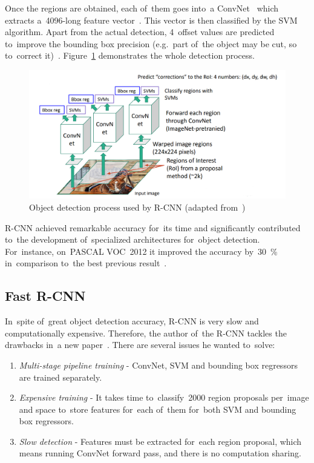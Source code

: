 Once the regions are obtained, each of~them goes into~a ConvNet~\cite{r-cnn-cnn} which extracts \hbox{a 4096-long} feature vector~\cite{r-cnn}. This vector is then classified by the SVM~\cite{svm} algorithm. Apart from the actual detection, 4~offset values are predicted to~improve the bounding box precision (e.g.~part of~the object may be cut, so to~correct it)~\cite{stanford-object-detection-lecture}. Figure~\ref{algorithms-rcnn} demonstrates the whole detection process.

\begin{figure}[hbt]
    \includegraphics[width=1\textwidth]{img/algorithms/rcnn.png}
    \caption{Object detection process used by R-CNN (adapted from~\cite{stanford-object-detection-lecture})}
    \label{algorithms-rcnn}
\end{figure}

R-CNN achieved remarkable accuracy for~its time and significantly contributed to~the development of~specialized architectures for~object detection. For~instance, on~PASCAL VOC~2012 it improved the accuracy by~30~\% in~comparison to~the best previous result~\cite{r-cnn}.

\subsection{Fast R-CNN}
\label{algorithms-nn-fast-rcnn}
In~spite of~great object detection accuracy, R-CNN is very slow and computationally \hbox{expensive}. Therefore, the author of~the R-CNN tackles the drawbacks in~a new paper~\cite{fast-rcnn}. There are several issues he wanted to~solve:

\begin{enumerate}[topsep=0pt,itemsep=-1.5pt,partopsep=6pt]
    \item \emph{Multi-stage pipeline training} - ConvNet, SVM and bounding box regressors are trained separately.
    \item \emph{Expensive training} - It takes time to~classify~2000 region proposals per~image and space to~store features for~each of~them for~both SVM and bounding box regressors.
    \item \emph{Slow detection} - Features must be extracted for~each region proposal, which means running ConvNet forward pass, and there is no computation sharing.
\end{enumerate}

